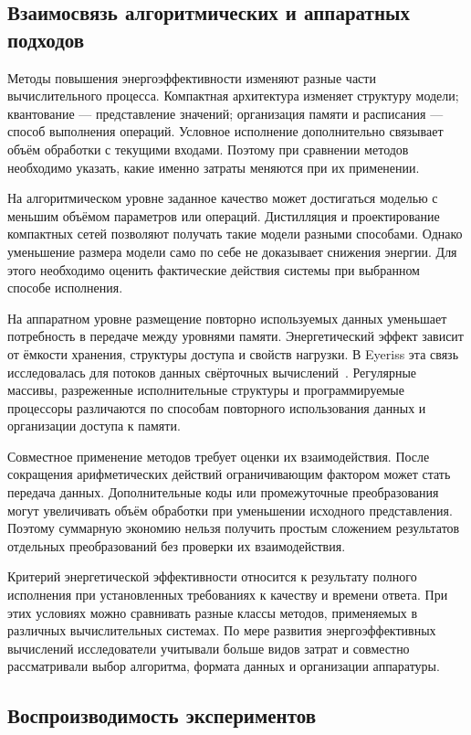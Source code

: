 \subsection{Взаимосвязь алгоритмических и аппаратных подходов}

Методы повышения энергоэффективности изменяют разные части вычислительного
процесса. Компактная архитектура изменяет
структуру модели; квантование — представление значений;
организация памяти и расписания — способ выполнения операций.
Условное исполнение дополнительно связывает объём обработки
с текущими входами. Поэтому при сравнении методов необходимо указать, какие именно затраты
меняются при их применении.

На алгоритмическом уровне заданное качество может достигаться
моделью с меньшим объёмом параметров или операций.
Дистилляция и проектирование компактных сетей позволяют получать такие модели
разными способами. Однако уменьшение размера модели само по себе не доказывает
снижения энергии. Для этого необходимо оценить фактические действия системы
при выбранном способе исполнения.

На аппаратном уровне размещение повторно используемых
данных уменьшает потребность в передаче между уровнями
памяти. Энергетический эффект зависит от ёмкости хранения,
структуры доступа и свойств нагрузки. В Eyeriss эта связь
исследовалась для потоков данных свёрточных вычислений~\cite{eyeriss2016}.
Регулярные массивы, разреженные исполнительные структуры
и программируемые процессоры различаются по способам повторного использования данных и организации доступа
к памяти.

Совместное применение методов требует оценки их взаимодействия.
После сокращения арифметических действий ограничивающим
фактором может стать передача данных. Дополнительные коды
или промежуточные преобразования могут увеличивать объём
обработки при уменьшении исходного представления.
Поэтому суммарную экономию нельзя получить простым сложением результатов
отдельных преобразований без проверки их взаимодействия.

Критерий энергетической эффективности относится к результату
полного исполнения при установленных требованиях к качеству
и времени ответа. При этих условиях можно сравнивать разные классы методов, применяемых в
различных вычислительных системах. По мере развития энергоэффективных
вычислений исследователи учитывали больше видов затрат и совместно
рассматривали выбор алгоритма, формата данных и организации аппаратуры.

\subsection{Воспроизводимость экспериментов}

